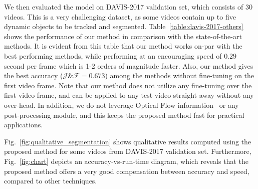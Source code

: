 \documentclass[10pt,twocolumn,letterpaper]{article}
\begin{document}
We then evaluated the model on DAVIS-2017 validation set, which consists of 30 videos. This is a very challenging dataset, as some videos contain up to five dynamic objects to be tracked and segmented. 
Table~\ref{table:davis-2017-others} shows the performance of our method in comparison with the state-of-the-art methods. 
It is evident from this table that our method works on-par with the best performing methods, while performing at an encouraging speed of $0.29$ second per frame which is 1-2 orders of magnitude faster. Also, our method gives the best accuracy ($\mathcal{J}$\&$\mathcal{F}=0.673$) among the methods without fine-tuning on the first video frame.
Note that our method does not utilize any fine-tuning over the first video frame, and can be applied to any test video straight-away without any over-head. 
In addition, we do not leverage Optical Flow information~\cite{Dosovitskiy_2015_ICCV} or any post-processing module, and this keeps the proposed method fast for practical applications. 

Fig.~\ref{fig:qualitative_segmentation} shows qualitative results computed using the proposed method for some videos from DAVIS-2017 validation set. 
Furthermore, Fig.~\ref{fig:chart} depicts an accuracy-vs-run-time diagram, which reveals that the proposed method offers a very good compensation between accuracy and speed, compared to other techniques. 
\end{document}
